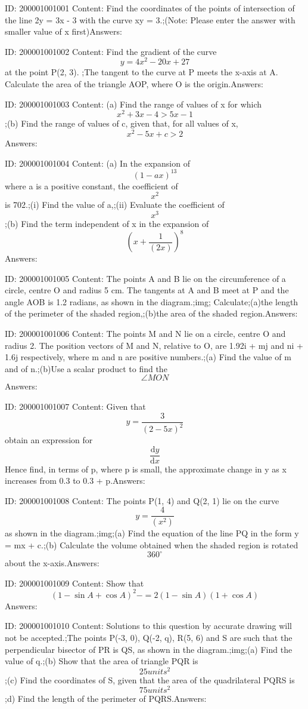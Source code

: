 \documentclass{article}
\begin{document}
ID: 200001001001
Content:
Find the coordinates of the points of intersection of the line 2y = 3x - 3 with the curve xy = 3.;(Note: Please enter the answer with smaller value of x first)Answers:

ID: 200001001002
Content:
Find the gradient of the curve \[y=4x^2-20x+27\] at the point P(2, 3). ;The tangent to the curve at P meets the x-axis at A. Calculate the area of the triangle AOP, where O is the origin.Answers:

ID: 200001001003
Content:
(a)	Find the range of values of x for which \[x^2+3x-4>5x-1\];(b)	Find the range of values of c, given that, for all values of x, \[x^2-5x+c>2\]Answers:

ID: 200001001004
Content:
(a)	In the expansion of \[(1-ax)^{13}\] where a is a positive constant, the coefficient of \[x^2\] is 702.;(i)	Find the value of a,;(ii) Evaluate the coefficient of \[x^3\];(b) Find the term independent of x in the expansion of \[(x+\frac{1}{(2x)})^8\]Answers:

ID: 200001001005
Content:
The points A and B lie on the circumference of a circle, centre O and radius 5 cm. The tangents at A and B meet at P and the angle AOB is 1.2 radians, as shown in the diagram.;img; Calculate;(a)the length of the perimeter of the shaded region,;(b)the area of the shaded region.Answers:

ID: 200001001006
Content:
The points M and N lie on a circle, centre O and radius 2. The position vectors of M and N, relative to O, are 1.92i + mj and ni + 1.6j respectively, where m and n are positive numbers.;(a) Find the value of m and of n.;(b)Use a scalar product to find the \[\angle MON\]Answers:

ID: 200001001007
Content:
Given that \[y=\frac{3}{(2-5x)^2}\] obtain an expression for \[\frac{\mathrm{d} y}{\mathrm{d} x}\] Hence find, in terms of p, where p is small, the approximate change in y as x increases from 0.3 to 0.3 + p.Answers:

ID: 200001001008
Content:
The points P(1, 4) and Q(2, 1) lie on the curve \[y=\frac{4}{(x^2)}\] as shown in the diagram.;img;(a)	Find the equation of the line PQ in the form y = mx + c.;(b)	Calculate the volume obtained when the shaded region is rotated \[360^{\circ}\] about the x-axis.Answers:

ID: 200001001009
Content:
Show that \[(1-\sin A+\cos A)^2-=2(1-\sin A)(1+\cos A)\]Answers:

ID: 200001001010
Content:
Solutions to this question by accurate drawing will not be accepted.;The points P(-3, 0), Q(-2, q), R(5, 6) and S are such that the perpendicular bisector of PR is QS, as shown in the diagram.;img;(a)	Find the value of q.;(b) Show that the area of triangle PQR is \[25units^2\];(c)	Find the coordinates of S, given that the area of the quadrilateral PQRS is \[75units^2\];d)	Find the length of the perimeter of PQRS.Answers:
\end{document}
